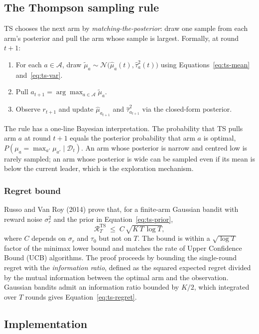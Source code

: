 \documentclass{article}
\begin{document}
\subsection{The Thompson sampling rule}

TS chooses the next arm by \emph{matching-the-posterior}: draw one sample from each arm's posterior and pull the arm whose sample is largest. Formally, at round $t + 1$:
\begin{enumerate}
\item For each $a \in \mathcal{A}$, draw $\tilde\mu_a \sim \mathcal{N}\bigl(\hat\mu_a(t), \hat\tau_a^2(t)\bigr)$ using Equations~\ref{eq:ts-mean} and~\ref{eq:ts-var}.
\item Pull $a_{t+1} = \arg\max_{a \in \mathcal{A}} \tilde\mu_a$.
\item Observe $r_{t+1}$ and update $\hat\mu_{a_{t+1}}$ and $\hat\tau_{a_{t+1}}^2$ via the closed-form posterior.
\end{enumerate}
The rule has a one-line Bayesian interpretation. The probability that TS pulls arm $a$ at round $t + 1$ equals the posterior probability that arm $a$ is optimal, $P(\mu_a = \max_{a'} \mu_{a'} \mid \mathcal{D}_t)$. An arm whose posterior is narrow and centred low is rarely sampled; an arm whose posterior is wide can be sampled even if its mean is below the current leader, which is the exploration mechanism.

\subsubsection*{Regret bound}

Russo and Van Roy (2014) prove that, for a finite-arm Gaussian bandit with reward noise $\sigma_r^2$ and the prior in Equation~\ref{eq:ts-prior},
\begin{equation}
\mathcal{R}_T^{\mathrm{TS}} \;\leq\; C\,\sqrt{K\,T\,\log T},
\label{eq:ts-regret}
\end{equation}
where $C$ depends on $\sigma_r$ and $\tau_0$ but not on $T$. The bound is within a $\sqrt{\log T}$ factor of the minimax lower bound and matches the rate of Upper Confidence Bound (UCB) algorithms. The proof proceeds by bounding the single-round regret with the \emph{information ratio}, defined as the squared expected regret divided by the mutual information between the optimal arm and the observation. Gaussian bandits admit an information ratio bounded by $K/2$, which integrated over $T$ rounds gives Equation~\ref{eq:ts-regret}.

\subsection{Implementation}
\end{document}
